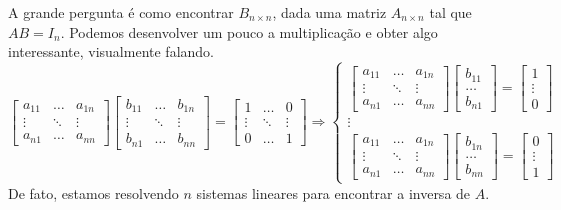 \documentclass[../main.tex]{subfiles}
\begin{document}
			A grande pergunta é como encontrar $B_{n\times n}$, dada uma matriz $A_{n\times n}$ tal que $AB=I_n$. Podemos desenvolver um pouco a multiplicação e obter algo interessante, visualmente falando.
			\[
			\begin{bmatrix}
				a_{11} & \dots & a_{1n}\\
				\vdots & \ddots& \vdots\\
				a_{n1} & \dots & a_{nn}
			\end{bmatrix}
			\begin{bmatrix}
				b_{11} & \dots & b_{1n}\\
				\vdots & \ddots& \vdots\\
				b_{n1} & \dots & b_{nn}
			\end{bmatrix}
			=
			\begin{bmatrix}
				1 & \dots & 0\\
				\vdots & \ddots& \vdots\\
				0 & \dots & 1
			\end{bmatrix}
			\Rightarrow
			\begin{cases}
				\begin{bmatrix}
					a_{11} & \dots & a_{1n}\\
					\vdots & \ddots& \vdots\\
					a_{n1} & \dots & a_{nn}
				\end{bmatrix}
				\begin{bmatrix}
					b_{11} \\
					\dots\\
					b_{n1}
				\end{bmatrix}
				=
				\begin{bmatrix}
					1 \\
					\vdots\\
					0
				\end{bmatrix}\\
				\vdots \\
				\begin{bmatrix}
					a_{11} & \dots & a_{1n}\\
					\vdots & \ddots& \vdots\\
					a_{n1} & \dots & a_{nn}
				\end{bmatrix}
				\begin{bmatrix}
					b_{1n} \\
					\dots\\
					b_{nn}
				\end{bmatrix}
				=
				\begin{bmatrix}
					0 \\
					\vdots\\
					1
				\end{bmatrix}
			\end{cases}
			\]
			De fato, estamos resolvendo $n$ sistemas lineares para encontrar a inversa de $A$.
			
\end{document}
